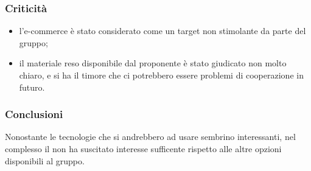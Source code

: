 \documentclass[]{article}
\begin{document}
			\subsubsection{Criticità}
			\begin{itemize}
			    \item l'e-commerce è stato considerato come un target non stimolante da parte del gruppo;
				\item il materiale reso disponibile dal proponente è stato giudicato non molto chiaro, e si ha il timore che ci potrebbero essere problemi di cooperazione in futuro.
			\end{itemize}

			\subsubsection{Conclusioni}
			Nonostante le tecnologie che si andrebbero ad usare sembrino interessanti, nel complesso il  non ha suscitato interesse sufficente rispetto alle altre opzioni disponibili al gruppo.
		
		\newpage
\end{document}

